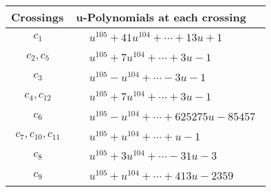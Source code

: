 \documentclass[1p]{elsarticle_modified}
\theoremstyle{definition}
\begin{document}
\begin{tabular}{m{50pt}|m{274pt}}
Crossings & \hspace{64pt}u-Polynomials at each crossing \\
\hline $$\begin{aligned}c_{1}\end{aligned}$$&$\begin{aligned}
&u^{105}+41 u^{104}+\cdots+13 u+1
\end{aligned}$\\
\hline $$\begin{aligned}c_{2},c_{5}\end{aligned}$$&$\begin{aligned}
&u^{105}+7 u^{104}+\cdots+3 u-1
\end{aligned}$\\
\hline $$\begin{aligned}c_{3}\end{aligned}$$&$\begin{aligned}
&u^{105}- u^{104}+\cdots-3 u-1
\end{aligned}$\\
\hline $$\begin{aligned}c_{4},c_{12}\end{aligned}$$&$\begin{aligned}
&u^{105}+7 u^{104}+\cdots+3 u-1
\end{aligned}$\\
\hline $$\begin{aligned}c_{6}\end{aligned}$$&$\begin{aligned}
&u^{105}- u^{104}+\cdots+625275 u-85457
\end{aligned}$\\
\hline $$\begin{aligned}c_{7},c_{10},c_{11}\end{aligned}$$&$\begin{aligned}
&u^{105}+u^{104}+\cdots+u-1
\end{aligned}$\\
\hline $$\begin{aligned}c_{8}\end{aligned}$$&$\begin{aligned}
&u^{105}+3 u^{104}+\cdots-31 u-3
\end{aligned}$\\
\hline $$\begin{aligned}c_{9}\end{aligned}$$&$\begin{aligned}
&u^{105}+u^{104}+\cdots+413 u-2359
\end{aligned}$\\
\hline
\end{tabular}\newpage\renewcommand{\arraystretch}{1}
\end{document}
